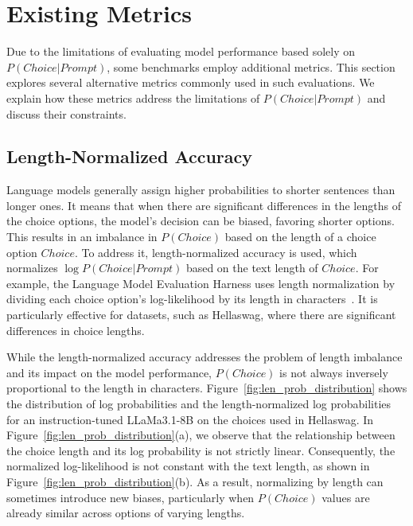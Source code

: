 
\section{Existing Metrics}
Due to the limitations of evaluating model performance based solely on {\small $P(Choice|Prompt)$}, some benchmarks employ additional metrics. This section explores several alternative metrics commonly used in such evaluations. We explain how these metrics address the limitations of {\small $P(Choice|Prompt)$} and discuss their constraints. 

\subsection{Length-Normalized Accuracy}
\label{sec:metric_norm}
Language models generally assign higher probabilities to shorter sentences than longer ones. It means that when there are significant differences in the lengths of the choice options, the model's decision can be biased, favoring shorter options. This results in an imbalance in {\small $P(Choice)$} based on the length of a choice option $Choice$. To address it, length-normalized accuracy is used, which normalizes 
{\small $\log{P(Choice|Prompt)}$} based on the text length of $Choice$. For example, the Language Model Evaluation Harness uses length normalization by dividing each choice option's log-likelihood by its length in characters~\citep{eval-harness}. It is particularly effective for datasets, such as Hellaswag, where there are significant differences in choice lengths.

While the length-normalized accuracy addresses the problem of length imbalance and its impact on the model performance, {\small $P(Choice)$} is not always inversely proportional to the length in characters. Figure~\ref{fig:len_prob_distribution} shows the distribution of log probabilities and the length-normalized log probabilities for an instruction-tuned LLaMa3.1-8B on the choices used in Hellaswag. In Figure~\ref{fig:len_prob_distribution}(a), we observe that the relationship between the choice length and its log probability is not strictly linear. Consequently, the normalized log-likelihood is not constant with the text length, as shown in Figure~\ref{fig:len_prob_distribution}(b). As a result, normalizing by length can sometimes introduce new biases, particularly when {\small $P(Choice)$} values are already similar across options of varying lengths.

